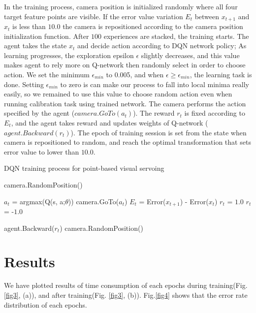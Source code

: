 \documentclass[10pt]{article}
\begin{document}
In the training process, camera position is initialized randomly where all four target feature points are visible. If the error value variation $E_t$ between $x_{t+1}$ and $x_t$ is less than $10.0$ the camera is repositioned according to the camera position initialization function. After $100$ experiences are stacked, the training starts. The agent takes the state $x_t$ and decide action according to DQN network policy; As learning progresses, the exploration epsilon $\epsilon$ slightly decreases, and this value makes agent to rely more on Q-network then randomly select in order to choose action. We set the minimum $\epsilon_{min}$ to 0.005, and when $\epsilon \geq \epsilon_{min}$, the learning task is done. Setting $\epsilon_{min}$ to zero is can make our process to fall into local minima really easily, so we remained to use this value to choose random action even when running calibration task using trained network. The camera performs the action specified by the agent ($camera.GoTo(a_t)$). The reward $r_t$ is fixed according to $E_t$, and the agent takes reward and updates weights of Q-network ($agent.Backward(r_t)$).
The epoch of training session is set from the state when camera is repositioned to random, and reach the optimal transformation that sets error value to lower than $10.0$.

 \begin{algorithm}
   \caption{DQN training process for point-based visual servoing}\label{algo1}
   \begin{algorithmic}[1]

     \State camera.RandomPosition()



     \State $a_t$ =  argmax(Q(s, a;$\theta$))
     \State camera.GoTo($a_t$)
     \State $E_t$ = Error($x_{t+1}$) - Error($x_t$)
     \State $r_t$ = $1.0$
     \Else
     \State $r_t$ = -$1.0$
     \EndIf

     agent.Backward($r_t$)
     camera.RandomPosition()
     \EndIf

     \EndFor

   \end{algorithmic}
 \end{algorithm}


\section{Results}
We have plotted results of time consumption of each epochs during training(Fig.\ref{fig3}, (a)), and after training(Fig. \ref{fig3}, (b)). Fig.\ref{fig4} shows that the error rate distribution of each epochs. 
\end{document}
